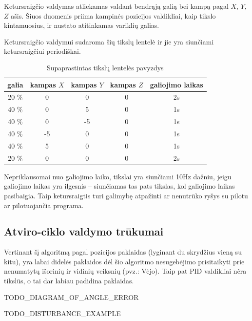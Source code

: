 \documentclass[12pt, a4paper, lithuanian, final]{article}
\begin{document}
Ketursraigčio valdymas atliekamas valdant bendrąją galią bei kampą pagal $X$, $Y$, $Z$ ašis.
Šiuos duomenis priima kampinės pozicijos valdikliai, kaip tikslo kintamuosius, ir nustato atitinkamas variklių galias.

Ketursraigčio valdymui sudaroma šių tikslų lentelė ir jie yra siunčiami ketursraigčiui periodiškai.

\begin{center}
\begin{table}[h]
\begin{tabular}{ | c | c | c | c | c | }
	\hline
	\textbf{galia} & \textbf{kampas $X$} & \textbf{kampas $Y$} & \textbf{kampas $Z$} & \textbf{galiojimo laikas} \\
	\hline
	20 \% & 0\degree & 0\degree & 0\degree & 2s \\
	\hline
	40 \% & 0\degree & 5\degree & 0\degree & 1s \\
	\hline
	40 \% & 0\degree & -5\degree & 0\degree & 1s \\
	\hline
	40 \% & -5\degree & 0\degree & 0\degree & 1s \\
	\hline
	40 \% & 5\degree & 0\degree & 0\degree & 1s \\
	\hline
	20 \% & 0\degree & 0\degree & 0\degree & 2s \\
	\hline
\end{tabular}
\caption{Supaprastintas tikslų lentelės pavyzdys}
\end{table}
\end{center}

Nepriklausomai nuo galiojimo laiko, tikslai yra siunčiami 10Hz dažniu, jeigu galiojimo laikas yra ilgesnis -- siunčiamas tas pats tikslas, kol galiojimo laikas pasibaigia.
Taip ketursraigtis turi galimybę atpažinti ar nenutrūko ryšys su pilotu ar pilotuojančia programa.

\subsection{Atviro-ciklo valdymo trūkumai}

Vertinant šį algoritmą pagal pozicijos paklaidas (lyginant du skrydžius vieną su kitu), yra labai didelės paklaidos dėl šio algoritmo nesugebėjimo prisitaikyti prie nenumatytų išorinių ir vidinių veiksnių (pvz.: Vėjo).
Taip pat PID valdikliai nėra tikslūs, o tai dar labiau padidina paklaidas.

TODO\_DIAGRAM\_OF\_ANGLE\_ERROR

TODO\_DISTURBANCE\_EXAMPLE
\end{document}
